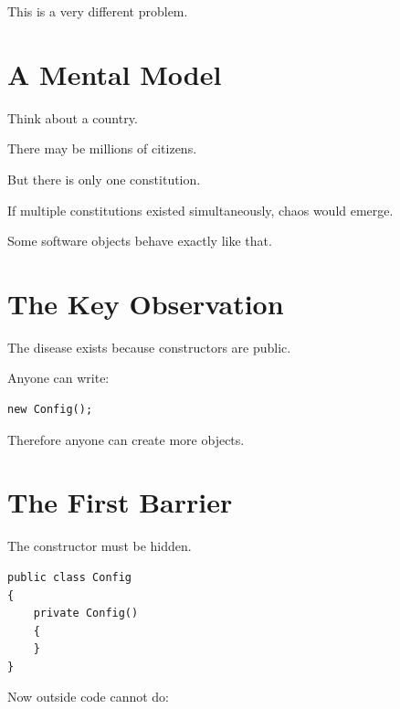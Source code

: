 \documentclass[11pt,a4paper]{book}
\begin{document}
This is a very different problem.


\section{A Mental Model}

\begin{mentalmodel}

Think about a country.

There may be millions of citizens.

But there is only one constitution.

If multiple constitutions existed simultaneously,
chaos would emerge.

Some software objects behave exactly like that.

\end{mentalmodel}


\section{The Key Observation}

\begin{idea}

The disease exists because constructors are public.

Anyone can write:

\begin{verbatim}
new Config();
\end{verbatim}

Therefore anyone can create more objects.

\end{idea}


\section{The First Barrier}

The constructor must be hidden.

\begin{verbatim}
public class Config
{
    private Config()
    {
    }
}
\end{verbatim}

Now outside code cannot do:
\end{document}
